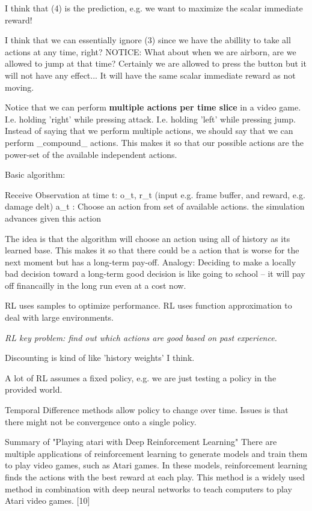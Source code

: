 I think that (4) is the prediction, e.g. we want to maximize the scalar immediate reward!

I think that we can essentially ignore (3) since we have the abillity to take all actions at any time, right?
NOTICE: What about when we are airborn, are we allowed to jump at that time?
Certainly we are allowed to press the button but it will not have any effect... It will have the same scalar immediate reward as not moving.

Notice that we can perform \textbf{multiple actions per time slice} in a video game.
I.e. holding 'right' while pressing attack.
I.e. holding 'left' while pressing jump.
Instead of saying that we perform multiple actions, we should say that we can perform _compound_ actions. 
This makes it so that our possible actions are the power-set of the available independent actions.

Basic algorithm:
  \begin{listlisting}
Receive Observation at time t:
  o_t, r_t (input e.g. frame buffer, and reward, e.g. damage delt)
  a_t : Choose an action from set of available actions.
  the simulation advances given this action
  \end{listlisting}

The idea is that the algorithm will choose an action using all of history as its learned base.
This makes it so that there could be a action that is worse for the next moment but has a long-term pay-off.
Analogy: Deciding to make a locally bad decision toward a long-term good decision is like going to school -- it will pay off financailly in the long run even at a cost now.

RL uses samples to optimize performance.
RL uses function approximation to deal with large environments.

\textit{RL key problem: find out which actions are good based on past experience.}

Discounting is kind of like 'history weights' I think.

A lot of RL assumes a fixed policy, e.g. we are just testing a policy in the provided world.

Temporal Difference methods allow policy to change over time.
  Issues is that there might not be convergence onto a single policy.
 
Summary of "Playing atari with Deep Reinforcement Learning"
There are multiple applications of reinforcement learning to generate models and train them to play video games, such as Atari games. 
In these models, reinforcement learning finds the actions with the best reward at each play. 
This method is a widely used method in combination with deep neural networks to teach computers to play Atari video games.
[10]


